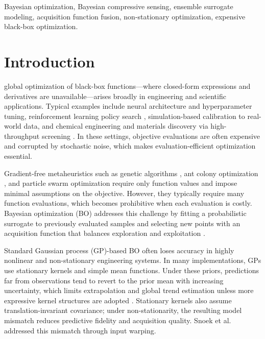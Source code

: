 \documentclass[lettersize,journal]{IEEEtran}
\begin{document}
\begin{IEEEkeywords}
Bayesian optimization, Bayesian compressive sensing, ensemble surrogate modeling, acquisition function fusion, non-stationary optimization, expensive black-box optimization.
\end{IEEEkeywords}

\section{Introduction}
 global optimization of black-box functions---where closed-form expressions and derivatives are unavailable---arises broadly in engineering and scientific applications. Typical examples include neural architecture and hyperparameter tuning, reinforcement learning policy search \cite{Calandra2016GaitsBO}, simulation-based calibration to real-world data, and chemical engineering and materials discovery via high-throughput screening \cite{HernandezLobato2017PDTS}. In these settings, objective evaluations are often expensive and corrupted by stochastic noise, which makes evaluation-efficient optimization essential.

Gradient-free metaheuristics such as genetic algorithms \cite{Holland1975GA}, ant colony optimization \cite{Dorigo1996AntSystem}, and particle swarm optimization \cite{EberhartKennedy1995PSO} require only function values and impose minimal assumptions on the objective. However, they typically require many function evaluations, which becomes prohibitive when each evaluation is costly. Bayesian optimization (BO) addresses this challenge by fitting a probabilistic surrogate to previously evaluated samples and selecting new points with an acquisition function that balances exploration and exploitation \cite{Shahriari2016ReviewBO,Frazier2018TutorialBO}.

Standard Gaussian process (GP)-based BO often loses accuracy in highly nonlinear and non-stationary engineering systems. In many implementations, GPs use stationary kernels and simple mean functions. Under these priors, predictions far from observations tend to revert to the prior mean with increasing uncertainty, which limits extrapolation and global trend estimation unless more expressive kernel structures are adopted \cite{RasmussenWilliams2006GPML,WilsonAdams2013Kernels}. Stationary kernels also assume translation-invariant covariance; under non-stationarity, the resulting model mismatch reduces predictive fidelity and acquisition quality. Snoek et al.\ \cite{Snoek2014InputWarping} addressed this mismatch through input warping.
\end{document}
